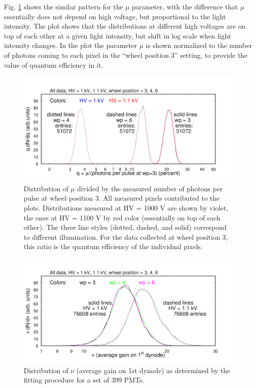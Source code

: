 Fig. \ref{fig:pglobal_qe_all} shows the similar pattern for the $\mu$ parameter, with the difference that $\mu$ essentially does not depend on high voltage, but proportional to the light intensity. The plot shows that the distributions at different high voltages are on top of each other at a given light intensity, but shift in log scale when light intensity changes. In the plot the parameter $\mu$ is shown normalized to the number of photons coming to each pixel in the ``wheel position 3'' setting, to provide the value of quantum efficiency in it. 
\begin{figure}[hbt]
	\centering
	\includegraphics[width=0.98\linewidth,trim=0 15 50 35,clip]{figures/pglobal_qe_all.pdf}
	\caption{Distribution of $\mu$ divided by the measured number of photons per pulse at wheel position 3. All measured pixels contributed to the plots. Distributions measured at HV = 1000 V are shown by violet, the ones at HV = 1100 V by red color (essentially on top of each other). The three line styles (dotted, dashed, and solid) correspond to different illumination. For the data collected at wheel position 3, this ratio is the quantum efficiency of the individual pixels.}
	\label{fig:pglobal_qe_all}
\end{figure}
\begin{figure}[h!bt]
	\centering
	\includegraphics[width=0.98\linewidth, trim=0 15 50 35,clip]{figures/pglobal_nu.pdf}
	\caption{Distribution of $\nu$ (average gain on 1st dynode) as determined by the fitting procedure for a set of 399 PMTs.}
	\label{fig:pglobal_nu}
\end{figure}



